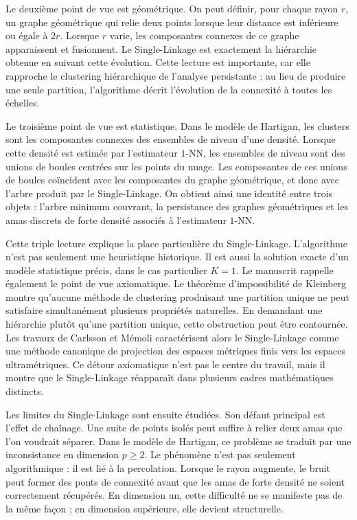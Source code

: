 Le deuxième point de vue est géométrique. On peut définir, pour chaque rayon $r$, un graphe géométrique qui relie deux points lorsque leur distance est inférieure ou égale à $2r$. Lorsque $r$ varie, les composantes connexes de ce graphe apparaissent et fusionnent. Le Single-Linkage est exactement la hiérarchie obtenue en suivant cette évolution. Cette lecture est importante, car elle rapproche le clustering hiérarchique de l'analyse persistante : au lieu de produire une seule partition, l'algorithme décrit l'évolution de la connexité à toutes les échelles.

Le troisième point de vue est statistique. Dans le modèle de Hartigan, les clusters sont les composantes connexes des ensembles de niveau d'une densité. Lorsque cette densité est estimée par l'estimateur $1$-NN, les ensembles de niveau sont des unions de boules centrées sur les points du nuage. Les composantes de ces unions de boules coïncident avec les composantes du graphe géométrique, et donc avec l'arbre produit par le Single-Linkage. On obtient ainsi une identité entre trois objets : l'arbre minimum couvrant, la persistance des graphes géométriques et les amas discrets de forte densité associés à l'estimateur $1$-NN.

Cette triple lecture explique la place particulière du Single-Linkage. L'algorithme n'est pas seulement une heuristique historique. Il est aussi la solution exacte d'un modèle statistique précis, dans le cas particulier $K=1$. Le manuscrit rappelle également le point de vue axiomatique. Le théorème d'impossibilité de Kleinberg montre qu'aucune méthode de clustering produisant une partition unique ne peut satisfaire simultanément plusieurs propriétés naturelles. En demandant une hiérarchie plutôt qu'une partition unique, cette obstruction peut être contournée. Les travaux de Carlsson et Mémoli caractérisent alors le Single-Linkage comme une méthode canonique de projection des espaces métriques finis vers les espaces ultramétriques. Ce détour axiomatique n'est pas le centre du travail, mais il montre que le Single-Linkage réapparaît dans plusieurs cadres mathématiques distincts.

Les limites du Single-Linkage sont ensuite étudiées. Son défaut principal est l'effet de chaînage. Une suite de points isolés peut suffire à relier deux amas que l'on voudrait séparer. Dans le modèle de Hartigan, ce problème se traduit par une inconsistance en dimension $p\geq 2$. Le phénomène n'est pas seulement algorithmique : il est lié à la percolation. Lorsque le rayon augmente, le bruit peut former des ponts de connexité avant que les amas de forte densité ne soient correctement récupérés. En dimension un, cette difficulté ne se manifeste pas de la même façon ; en dimension supérieure, elle devient structurelle.

